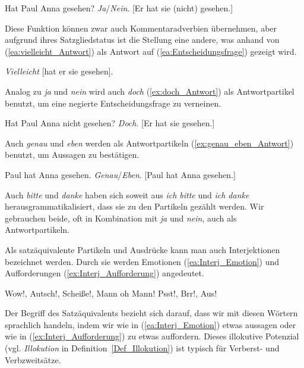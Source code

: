 \ea \label{ea:Antwortpartikeln}
\ea \label{ea:Entscheidungsfrage} Hat Paul Anna gesehen?
\ex \label{ex:ja_nein} \textit{Ja}/\textit{Nein}. [Er hat sie (nicht) gesehen.]
\z 
\z 

Diese Funktion können zwar auch Kommentaradverbien übernehmen, aber aufgrund ihres Satzgliedstatus ist die Stellung eine andere, was anhand von (\ref{ea:vielleicht_Antwort}) als Antwort auf (\ref{ea:Entscheidungsfrage}) gezeigt wird.

\ea \label{ea:vielleicht_Antwort} \textit{Vielleicht} [hat er sie gesehen].
\z 

Analog zu \textit{ja} und \textit{nein} wird auch \textit{doch} (\ref{ex:doch_Antwort}) als Antwortpartikel benutzt, um eine negierte Entscheidungsfrage zu verneinen. 

\ea \label{ea:Antwortpartikel_doch}
\ea \label{ea:neg_Entscheidungsfrage} Hat Paul Anna nicht gesehen?
\ex \label{ex:doch_Antwort} \textit{Doch}. [Er hat sie gesehen.] 
\z 
\z 

Auch \textit{genau} und \textit{eben} werden als Antwortpartikeln (\ref{ex:genau_eben_Antwort}) benutzt, um Aussagen zu bestätigen.

\ea \label{ea:ANtwortpartikel_genau}
\ea \label{ea:Aussage} Paul hat Anna gesehen.
\ex \label{ex:genau_eben_Antwort} \textit{Genau}/\textit{Eben}. [Paul hat Anna gesehen.]
\z 
\z 

Auch \textit{bitte} und \textit{danke} haben sich soweit aus \textit{ich bitte} und \textit{ich danke} herausgrammatikalisiert, dass sie zu den Partikeln gezählt werden. Wir gebrauchen beide, oft in Kombination mit \textit{ja} und \textit{nein}, auch als Antwortpartikeln. 

Als satzäquivalente Partikeln und Ausdrücke kann man auch Interjektionen bezeichnet werden. Durch sie werden \zB Emotionen (\ref{ea:Interj_Emotion}) und Aufforderungen (\ref{ex:Interj_Aufforderung}) angedeutet. 

\ea \label{Interjektionen}
\ea \label{ea:Interj_Emotion} Wow!, Autsch!, Scheiße!, Mann oh Mann! 
\ex \label{ex:Interj_Aufforderung} Psst!, Brr!, Aus!
\z 
\z 

Der Begriff des Satzäquivalents bezieht sich darauf, dass wir mit diesen Wörtern sprachlich handeln, indem wir wie in (\ref{ea:Interj_Emotion}) etwas aussagen oder wie in (\ref{ex:Interj_Aufforderung}) zu etwas auffordern. Dieses illokutive Potenzial (vgl. \textit{Illokution} in Definition~\ref{Def_Illokution}) ist typisch für Verberst- und Verbzweitsätze.


